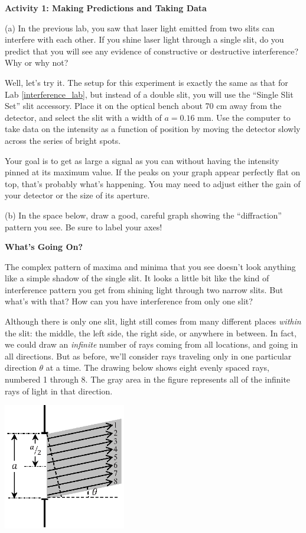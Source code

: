 \textbf{Activity 1: Making Predictions and Taking Data}

(a) In the previous lab, you saw that laser light emitted from two slits can interfere with each other.  If you shine laser light through a single slit, do you predict that you will see any evidence of constructive or destructive interference?  Why or why not?
\answerspace{0.8in}


Well, let's try it.  The setup for this experiment is exactly the same as that for Lab \ref{interference_lab},  but instead of a double slit, you will use the ``Single Slit Set'' slit accessory.  Place it on the optical bench about 70 cm away from the detector, and select the slit with a width of $a = 0.16$ mm.  Use the computer to take data on the intensity as a function of position by moving the detector slowly across the series of bright spots.  

Your goal is to get as large a signal as you can without having the intensity pinned at its maximum value.  If the peaks on your graph appear perfectly flat on top, that's probably what's happening. You may need to adjust either the gain of your detector or the size of its aperture.

(b) In the space below, draw a good, careful graph showing the ``diffraction'' pattern you see.  
Be sure to label your axes!
\answerspace{1.5in}

\pagebreak[2]
\textbf{What's Going On?}

The complex pattern of maxima and minima that you see doesn't look anything like a simple shadow of the single slit.  It looks a little bit like the kind of interference pattern you get from shining light through two narrow slits.  But what's with that?  How can you have interference from only one slit?

Although there is only one slit, light still comes from many different places \textit{within} the slit: the middle, the left side, the right side, or anywhere in between.  In fact, we could draw an \textit{infinite} number of rays coming from all locations, and going in all directions.  But as before, we'll consider rays traveling only in one particular direction $\theta$ at a time.  The drawing below shows eight evenly spaced rays, numbered 1 through 8.  The gray area in the figure represents all of the infinite rays of light in that direction.

\answerspace{0.2in}
\begin{center}
\includegraphics[width=0.4\textwidth]{diffraction_of_light/one_slit.eps}
\end{center}
\answerspace{0.2in}

